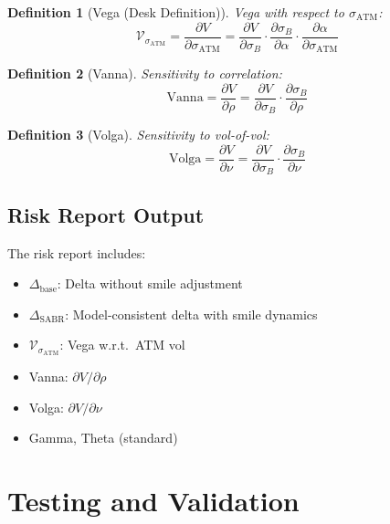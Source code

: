 \documentclass[12pt,a4paper]{report}
\newtheorem{definition}{Definition}[chapter]
\begin{document}
\begin{definition}[Vega (Desk Definition)]
Vega with respect to $\sigma_{\text{ATM}}$:
\begin{equation}
    \mathcal{V}_{\sigma_{\text{ATM}}} = \frac{\partial V}{\partial \sigma_{\text{ATM}}} = \frac{\partial V}{\partial \sigma_B} \cdot \frac{\partial \sigma_B}{\partial \alpha} \cdot \frac{\partial \alpha}{\partial \sigma_{\text{ATM}}}
\end{equation}
\end{definition}

\begin{definition}[Vanna]
Sensitivity to correlation:
\begin{equation}
    \text{Vanna} = \frac{\partial V}{\partial \rho} = \frac{\partial V}{\partial \sigma_B} \cdot \frac{\partial \sigma_B}{\partial \rho}
\end{equation}
\end{definition}

\begin{definition}[Volga]
Sensitivity to vol-of-vol:
\begin{equation}
    \text{Volga} = \frac{\partial V}{\partial \nu} = \frac{\partial V}{\partial \sigma_B} \cdot \frac{\partial \sigma_B}{\partial \nu}
\end{equation}
\end{definition}

\subsection{Risk Report Output}

The risk report includes:
\begin{itemize}[leftmargin=1.2em,itemsep=0.1em]
    \item $\Delta_{\text{base}}$: Delta without smile adjustment
    \item $\Delta_{\text{SABR}}$: Model-consistent delta with smile dynamics
    \item $\mathcal{V}_{\sigma_{\text{ATM}}}$: Vega w.r.t.\ ATM vol
    \item Vanna: $\partial V / \partial \rho$
    \item Volga: $\partial V / \partial \nu$
    \item Gamma, Theta (standard)
\end{itemize}

\section{Testing and Validation}
\end{document}
